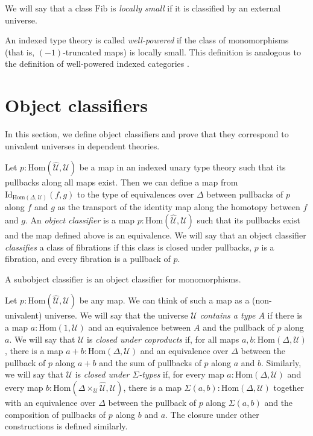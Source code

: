 \documentclass[reqno]{mscs}
\newcommand{\fs}[1]{\mathrm{#1}}
\newcommand{\Hom}{\fs{Hom}}
\newcommand{\Id}{\fs{Id}}
\newcommand{\Fib}{\fs{Fib}}
\numberwithin{figure}{section}
\begin{document}
\begin{defn}
We will say that a class $\Fib$ is \emph{locally small} if it is classified by an external universe.
\end{defn}

\begin{example}
An indexed type theory is called \emph{well-powered} if the class of monomorphisms (that is, $(-1)$-truncated maps) is locally small.
This definition is analogous to the definition of well-powered indexed categories \cite[Example~B1.3.14]{elephant}.
\end{example}

\section{Object classifiers}
\label{sec:class}

In this section, we define object classifiers and prove that they correspond to univalent universes in dependent theories.

Let $p : \Hom(\widehat{\mathcal{U}},\mathcal{U})$ be a map in an indexed unary type theory such that its pullbacks along all maps exist.
Then we can define a map from $\Id_{\Hom(\Delta,\mathcal{U})}(f,g)$ to the type of equivalences over $\Delta$ between pullbacks of $p$ along $f$ and $g$ as the transport of the identity map along the homotopy between $f$ and $g$.
An \emph{object classifier} is a map $p : \Hom(\widehat{\mathcal{U}},\mathcal{U})$ such that its pullbacks exist and the map defined above is an equivalence.
We will say that an object classifier \emph{classifies} a class of fibrations if this class is closed under pullbacks, $p$ is a fibration, and every fibration is a pullback of $p$.

\begin{example}
A subobject classifier is an object classifier for monomorphisms.
\end{example}

Let $p : \Hom(\widehat{\mathcal{U}},\mathcal{U})$ be any map.
We can think of such a map as a (non-univalent) universe.
We will say that the universe $\mathcal{U}$ \emph{contains a type $A$} if there is a map $a : \Hom(1,\mathcal{U})$ and an equivalence between $A$ and the pullback of $p$ along $a$.
We will say that $\mathcal{U}$ is \emph{closed under coproducts} if, for all maps $a,b : \Hom(\Delta,\mathcal{U})$, there is a map $a + b : \Hom(\Delta,\mathcal{U})$
and an equivalence over $\Delta$ between the pullback of $p$ along $a + b$ and the sum of pullbacks of $p$ along $a$ and $b$.
Similarly, we will say that $\mathcal{U}$ is \emph{closed under $\Sigma$-types} if, for every map $a : \Hom(\Delta,\mathcal{U})$
and every map $b : \Hom(\Delta \times_\mathcal{U} \widehat{\mathcal{U}}, \mathcal{U})$, there is a map $\Sigma(a,b) : \Hom(\Delta,\mathcal{U})$
together with an equivalence over $\Delta$ between the pullback of $p$ along $\Sigma(a,b)$ and the composition of pullbacks of $p$ along $b$ and $a$.
The closure under other constructions is defined similarly.
\end{document}
